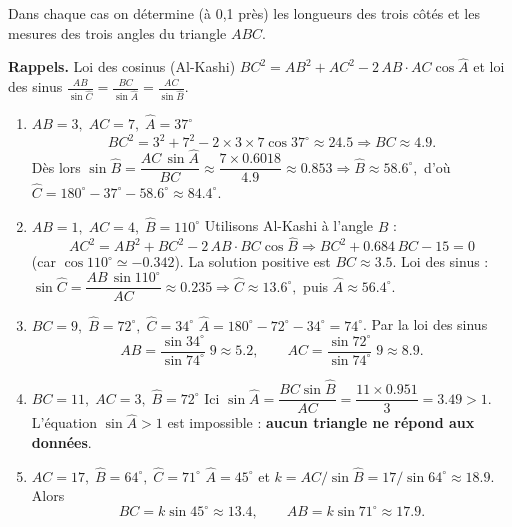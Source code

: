 \documentclass[a4paper,12pt]{article}
\begin{document}
\begin{exercice}
Dans chaque cas on détermine (à 0,1 près) les longueurs des trois côtés
et les mesures des trois angles du triangle $ABC$.
\end{exercice}

\begin{solution}[Correction]
\textbf{Rappels.}  
Loi des cosinus (Al-Kashi)
\(
BC^{2}=AB^{2}+AC^{2}-2\,AB\cdot AC\cos\widehat A
\)
et loi des sinus
\(
\displaystyle\frac{AB}{\sin\widehat C}
      =\frac{BC}{\sin\widehat A}
      =\frac{AC}{\sin\widehat B}.
\)

\begin{enumerate}
\item[\bfseries 1.] ${AB}=3,\;AC=7,\;\widehat A=37^{\circ}$  
  \[
  BC^{2}=3^{2}+7^{2}-2\!\times\!3\!\times\!7\cos37^{\circ}\approx24.5
  \Longrightarrow BC\approx4.9.
  \]
  Dès lors
  \(
  \sin\widehat B
  =\dfrac{AC\,\sin\widehat A}{BC}
  \approx\dfrac{7\times0.6018}{4.9}\approx0.853
  \Rightarrow
  \widehat B\approx58.6^{\circ},
  \)
  d’où
  \(
  \widehat C=180^{\circ}-37^{\circ}-58.6^{\circ}\approx84.4^{\circ}.
  \)

\smallskip
\item[\bfseries 2.] ${AB}=1,\;AC=4,\;\widehat B=110^{\circ}$  
  Utilisons Al-Kashi à l’angle $B$ :
  \[
  AC^{2}=AB^{2}+BC^{2}-2\,AB\cdot BC\cos\widehat B
  \Longrightarrow
  BC^{2}+0.684\,BC-15=0
  \]
  (car $\cos110^{\circ}\simeq-0.342$).  
  La solution positive est $BC\approx3.5$.  
  Loi des sinus :
  \(
  \sin\widehat C
  =\dfrac{AB\,\sin110^{\circ}}{AC}\approx0.235
  \Rightarrow\widehat C\approx13.6^{\circ},
  \)
  puis $\widehat A\approx56.4^{\circ}$.

\smallskip
\item[\bfseries 3.] ${BC}=9,\;\widehat B=72^{\circ},\;\widehat C=34^{\circ}$  
  $\widehat A=180^{\circ}-72^{\circ}-34^{\circ}=74^{\circ}$.  
  Par la loi des sinus
  \[
  AB=\frac{\sin34^{\circ}}{\sin74^{\circ}}\;9\approx5.2,
  \qquad
  AC=\frac{\sin72^{\circ}}{\sin74^{\circ}}\;9\approx8.9.
  \]

\smallskip
\item[\bfseries 4.] ${BC}=11,\;AC=3,\;\widehat B=72^{\circ}$  
  Ici
  \(
  \sin\widehat A=\dfrac{BC\sin\widehat B}{AC}
  =\dfrac{11\times0.951}{3}=3.49>1.
  \)
  L’équation $\sin\widehat A>1$ est impossible : \textbf{aucun triangle
  ne répond aux données}.  

\smallskip
\item[\bfseries 5.] ${AC}=17,\;\widehat B=64^{\circ},\;\widehat C=71^{\circ}$  
  $\widehat A=45^{\circ}$ et $k=AC/\sin\widehat B
  =17/\sin64^{\circ}\approx18.9$.  
  Alors
  \[
    BC=k\sin45^{\circ}\approx13.4,
    \qquad
    AB=k\sin71^{\circ}\approx17.9.
  \]
\end{enumerate}
\end{solution}
\end{document}
